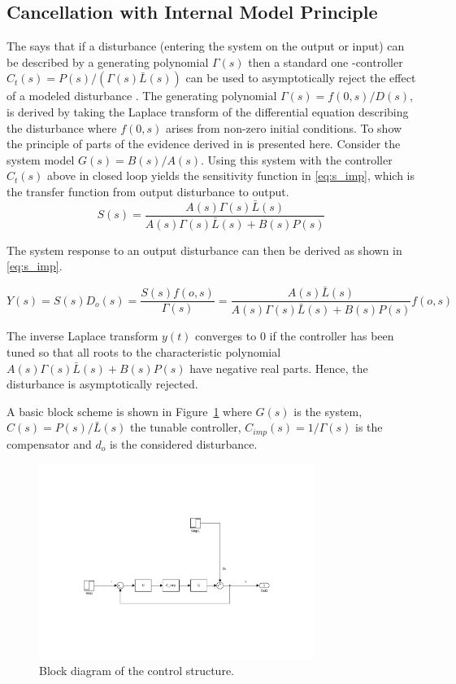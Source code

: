 \subsection{Cancellation with Internal Model Principle}\label{subsec:distimp}
The \abbrIMP says that if a disturbance (entering the system on the output or input) can be described by a generating polynomial $\Gamma(s)$ then a standard one \abbrDOF-controller $C_{t}(s) = P(s)/(\Gamma(s)\bar{L}(s))$ can be used to asymptotically reject the effect of a modeled disturbance \citep{IMP:Perry}.  The generating polynomial $\Gamma(s) = f(0,s)/D(s)$, is derived by taking the Laplace transform of the differential equation describing the disturbance where $f(0,s)$ arises from non-zero initial conditions. To show the principle of \abbrIMP parts of the evidence derived in \citep{IMP:Perry} is presented here. Consider the system model $G(s) = B(s)/A(s)$. Using this system with the controller $C_t(s)$ above in closed loop yields the sensitivity function in \eqref{eq:s_imp}, which is the transfer function from output disturbance to output.
\begin{equation}
  \label{eq:s_imp}
  S(s) = \frac{A(s)\Gamma(s)\bar{L}(s)}{A(s)\Gamma(s)\bar{L}(s) + B(s)P(s)}
\end{equation}

The system response to an output disturbance can then be derived as shown in \eqref{eq:s_imp}.

\begin{equation}
  \label{eq:y_imp}
  Y(s) = S(s)D_o(s) = \frac{S(s)f(o,s)}{\Gamma(s)} = \frac{A(s)\bar{L}(s)}{A(s)\Gamma(s)\bar{L}(s) + B(s)P(s)}f(o,s)
\end{equation}

The inverse Laplace transform $y(t)$ converges to 0 if the controller has been tuned so that all roots to the characteristic polynomial $A(s)\Gamma(s)\bar{L}(s) + B(s)P(s)$ have negative real parts. Hence, the disturbance is asymptotically rejected.

A basic block scheme is shown in Figure~\ref{fig:imp} where $G(s)$ is the system, $C(s) = P(s)/\bar{L}(s)$ the tunable controller, $C_{imp}(s) = 1/\Gamma(s)$ is the compensator and $d_o$ is the considered disturbance.

\begin{figure}[h!]
  \centering %
  \includegraphics[width=0.8\textwidth, trim=6.5cm 5.5cm 5.97cm 11cm, clip=true]{fig/matlab/imp}
  \caption{\label{fig:imp}Block diagram of the \abbrIMP control structure.}
\end{figure}
\newpage
